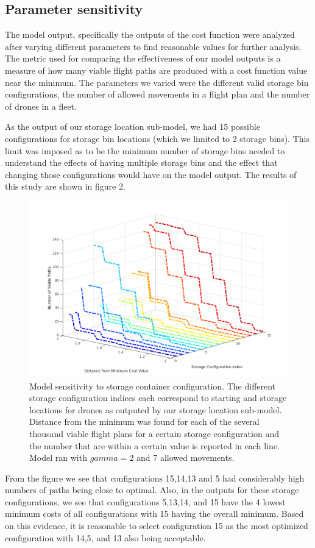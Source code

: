 \documentclass[twocolumn,10pt]{asme2ej}
\begin{document}
\subsection{Parameter sensitivity}
The model output, specifically the outputs of the cost function were analyzed after varying different parameters to find reasonable values for further analysis. The metric used for comparing the effectiveness of our model outputs is a measure of how many viable flight paths are produced with a cost function value near the minimum. The parameters we varied were the different valid storage bin configurations, the number of allowed movements in a flight plan and the number of drones in a fleet.

As the output of our storage location sub-model, we had 15 possible configurations for storage bin locations (which we limited to 2 storage bins). This limit was imposed as to be the minimum number of storage bins needed to understand the effects of having multiple storage bins and the effect that changing those configurations would have on the model output. The results of this study are shown in figure 2.
\begin{figure}
	\centering
	\includegraphics[width=1.1\linewidth]{../cost_output_per_storage}
	\caption[Fig 2]{Model sensitivity to storage container configuration. The different storage configuration indices each correspond to starting and storage locations for drones as outputed by our storage location sub-model. Distance from the minimum was found for each of the several thousand viable flight plans for a certain storage configuration and the number that are within a certain value is reported in each line. Model ran with $gamma=2$ and 7 allowed movements.}
	\label{Fig 2}
\end{figure}
From the figure we see that configurations 15,14,13 and 5 had considerably high numbers of paths being close to optimal. Also, in the outputs for these storage configurations, we see that configurations 5,13,14, and 15 have the 4 lowest minimum costs of all configurations with 15 having the overall minimum. Based on this evidence, it is reasonable to select configuration 15 as the most optimized configuration with 14,5, and 13 also being acceptable.
\end{document}
